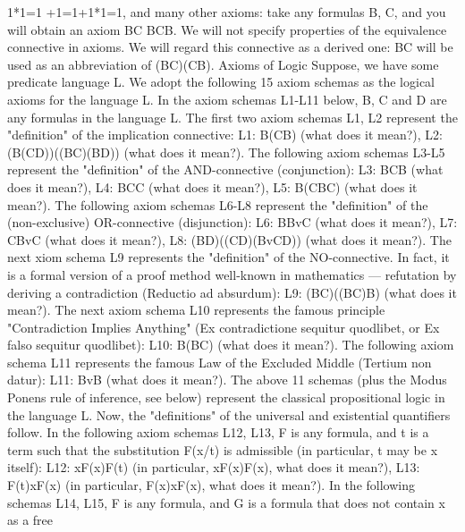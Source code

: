1*1=1 +1=1+1*1=1,
and many other axioms: take any formulas B, C, and you will obtain an axiom B\AND C B\AND C\IMPLIES B.
We will not specify properties of the equivalence connective in axioms. We will regard this connective as
a derived one: B\IFF C will be used as an abbreviation of (B\IMPLIES C)\AND (C\IMPLIES B).
Axioms of Logic
Suppose, we have some predicate language L. We adopt the following 15 axiom schemas as the logical
axioms for the language L.
In the axiom schemas L1-L11 below, B, C and D are any formulas in the language L.
The first two axiom schemas L1, L2 represent the "definition" of the implication connective:
L1: B\IMPLIES (C\IMPLIES B) (what does it mean?),
L2: (B\IMPLIES (C\IMPLIES D))\IMPLIES ((B\IMPLIES C)\IMPLIES (B\IMPLIES D)) (what does it mean?).
The following axiom schemas L3-L5 represent the "definition" of the AND-connective (conjunction):
L3: B\AND C\IMPLIES B (what does it mean?),
L4: B\AND C\IMPLIES C (what does it mean?),
L5: B\IMPLIES (C\IMPLIES B\AND C) (what does it mean?).
The following axiom schemas L6-L8 represent the "definition" of the (non-exclusive) OR-connective
(disjunction):
L6: B\IMPLIES BvC (what does it mean?),
L7: C\IMPLIES BvC (what does it mean?),
L8: (B\IMPLIES D)\IMPLIES ((C\IMPLIES D)\IMPLIES (BvC\IMPLIES D)) (what does it mean?).
The next xiom schema L9 represents the "definition" of the NO-connective. In fact, it is a formal version
of a proof method well-known in mathematics --- refutation by deriving a contradiction (Reductio ad
absurdum):
L9: (B\IMPLIES C)\IMPLIES ((B\IMPLIES \neg C)\IMPLIES \neg B) (what does it mean?).
The next axiom schema L10 represents the famous principle "Contradiction Implies Anything" (Ex
contradictione sequitur quodlibet, or Ex falso sequitur quodlibet):
L10: \neg B\IMPLIES (B\IMPLIES C) (what does it mean?).
The following axiom schema L11 represents the famous Law of the Excluded Middle (Tertium non
datur):
L11: Bv\neg B (what does it mean?).
The above 11 schemas (plus the Modus Ponens rule of inference, see below) represent the classical
propositional logic in the language L.
Now, the "definitions" of the universal and existential quantifiers follow.
In the following axiom schemas L12, L13, F is any formula, and t is a term such that the substitution F(x/t)
is admissible (in particular, t may be x itself):
L12: \forall xF(x)\IMPLIES F(t) (in particular, \forall xF(x)\IMPLIES F(x), what does it mean?),
L13: F(t)\IMPLIES \exists xF(x) (in particular, F(x)\IMPLIES \exists xF(x), what does it mean?).
In the following schemas L14, L15, F is any formula, and G is a formula that does not contain x as a free
